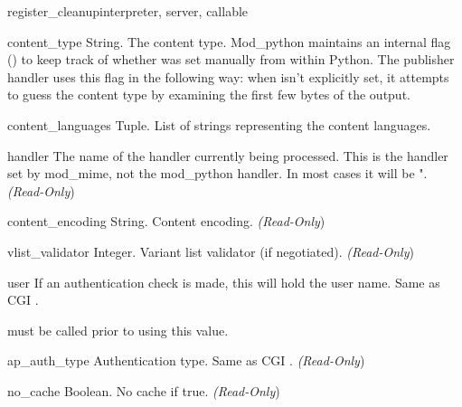\begin{funcdesc}{register_cleanup}{interpreter, server, callable}
\begin{memberdesc}[request]{content_type}
  String. The content type. Mod_python maintains an internal flag
  () to keep track of whether
   was set manually from within Python. The
  publisher handler uses this flag in the following way: when
   isn't explicitly set, it attempts to guess the
  content type by examining the first few bytes of the output.
\end{memberdesc}

\begin{memberdesc}[request]{content_languages}
  Tuple. List of strings representing the content languages. 
\end{memberdesc}

\begin{memberdesc}[request]{handler}
  The name of the handler currently being processed. This is the handler
  set by mod_mime, not the mod_python handler. In most cases it will be
  ". \emph{(Read-Only})
\end{memberdesc}

\begin{memberdesc}[request]{content_encoding}
  String. Content encoding.
  \emph{(Read-Only})
\end{memberdesc}

\begin{memberdesc}[request]{vlist_validator}
  Integer. Variant list validator (if negotiated).
  \emph{(Read-Only})
\end{memberdesc}

\begin{memberdesc}[request]{user}
  If an authentication check is made, this will hold the user
  name. Same as CGI .
  \begin{notice}
     must be called prior to using this value.
  \end{notice}
\end{memberdesc}

\begin{memberdesc}[request]{ap_auth_type}
  Authentication type. Same as CGI .
  \emph{(Read-Only})
\end{memberdesc}

\begin{memberdesc}[request]{no_cache}
  Boolean. No cache if true.
  \emph{(Read-Only})
\end{memberdesc}


\end{funcdesc}
